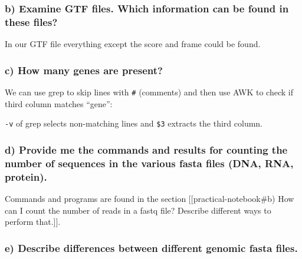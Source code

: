 \hypertarget{b-examine-gtf-files.-which-information-can-be-found-in-these-files}{%
\subsubsection{b) Examine GTF files. Which information can be found in
these
files?}\label{b-examine-gtf-files.-which-information-can-be-found-in-these-files}}

In our GTF file everything except the score and frame could be found.

\hypertarget{c-how-many-genes-are-present}{%
\subsubsection{c) How many genes are
present?}\label{c-how-many-genes-are-present}}

We can use grep to skip lines with \texttt{\#} (comments) and then use
AWK to check if third column matches ``gene'':

\begin{Shaded}
\begin{Highlighting}[]
\KeywordTok{|}    \KeywordTok{|}   \KeywordTok{|}  
\end{Highlighting}
\end{Shaded}

\texttt{-v} of grep selects non-matching lines and \texttt{\$3} extracts
the third column.

\hypertarget{d-provide-me-the-commands-and-results-for-counting-the-number-of-sequences-in-the-various-fasta-files-dna-rna-protein.}{%
\subsubsection{d) Provide me the commands and results for counting the
number of sequences in the various fasta files (DNA, RNA,
protein).}\label{d-provide-me-the-commands-and-results-for-counting-the-number-of-sequences-in-the-various-fasta-files-dna-rna-protein.}}

Commands and programs are found in the section
{[}{[}practical-notebook\#b) How can I count the number of reads in a
fastq file? Describe different ways to perform that.{]}{]}.

\hypertarget{e-describe-differences-between-different-genomic-fasta-files.}{%
\subsubsection{e) Describe differences between different genomic fasta
files.}\label{e-describe-differences-between-different-genomic-fasta-files.}}

